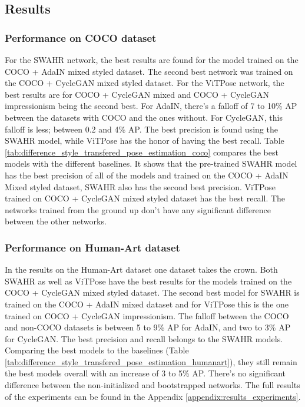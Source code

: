 \documentclass[conference]{IEEEtran}
\begin{document}
\subsection{Results}
\subsubsection{Performance on COCO dataset}
For the SWAHR network, the best results are found for the model trained on the COCO + AdaIN mixed styled dataset.
The second best network was trained on the COCO + CycleGAN mixed styled dataset.
For the ViTPose network, the best results are for COCO + CycleGAN mixed and COCO + CycleGAN impressionism being the second best.
For AdaIN, there's a falloff of 7 to 10\% AP between the datasets with COCO and the ones without.
For CycleGAN, this falloff is less; between 0.2 and 4\% AP.
The best precision is found using the SWAHR model, while ViTPose has the honor of having the best recall.
Table \ref{tab:difference_style_transfered_pose_estimation_coco} compares the best models with the different baselines.
It shows that the pre-trained SWAHR model has the best precision of all of the models and trained on the COCO + AdaIN Mixed styled dataset, SWAHR also has the second best precision.
ViTPose trained on COCO + CycleGAN mixed styled dataset has the best recall.
The networks trained from the ground up don't have any significant difference between the other networks.

\subsubsection{Performance on Human-Art dataset}
In the results on the Human-Art dataset one dataset takes the crown.
Both SWAHR as well as ViTPose have the best results for the models trained on the COCO + CycleGAN mixed styled dataset.
The second best model for SWAHR is trained on the COCO + AdaIN mixed dataset and for ViTPose this is the one trained on COCO + CycleGAN impressionism.
The falloff between the COCO and non-COCO datasets is between 5 to 9\% AP for AdaIN, and two to 3\% AP for CycleGAN.
The best precision and recall belongs to the SWAHR models.
Comparing the best models to the baselines (Table \ref{tab:difference_style_transfered_pose_estimation_humanart}), they still remain the best models overall with an increase of 3 to 5\% AP.
There's no significant difference between the non-initialized and bootstrapped networks.
The full results of the experiments can be found in the Appendix \ref{appendix:results_experiments}.
\end{document}
